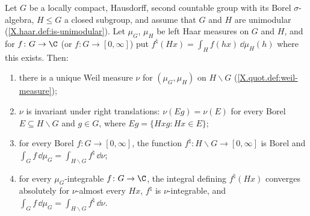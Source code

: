 Let $G$ be a locally compact, Hausdorff, second countable group with its Borel $\sigma$-algebra, $H\le G$ a closed subgroup,
and assume that $G$ and $H$ are unimodular (\cref{X.haar.def:is-unimodular}). Let $\mu_G$, $\mu_H$ be left Haar measures on $G$
and $H$, and for $f\colon G\to\C$ (or $f\colon G\to[0,\infty]$) put $f^\natural(Hx)=\int_Hf(hx)\,\dd\mu_H(h)$ where this exists. Then:
\begin{enumerate}
  \item[(a)] there is a unique Weil measure $\nu$ for $(\mu_G,\mu_H)$ on $H\backslash G$ (\cref{X.quot.def:weil-measure});
  \item[(b)] $\nu$ is invariant under right translations: $\nu(Eg)=\nu(E)$ for every Borel $E\subseteq H\backslash G$ and $g\in G$, where
  $Eg=\{Hxg:Hx\in E\}$;
  \item[(c)] for every Borel $f\colon G\to[0,\infty]$, the function $f^\natural\colon H\backslash G\to[0,\infty]$ is Borel and
  $\int_Gf\,\dd\mu_G=\int_{H\backslash G}f^\natural\,\dd\nu$;
  \item[(d)] for every $\mu_G$-integrable $f\colon G\to\C$, the integral defining $f^\natural(Hx)$ converges absolutely for $\nu$-almost every $Hx$,
  $f^\natural$ is $\nu$-integrable, and $\int_Gf\,\dd\mu_G=\int_{H\backslash G}f^\natural\,\dd\nu$.
\end{enumerate}
